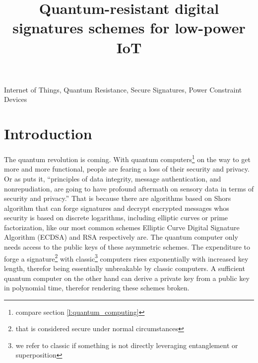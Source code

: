 \documentclass[conference]{IEEEtran}
\newcommand{\comment}[1]{}
\begin{document}
\title{Quantum-resistant digital signatures schemes for low-power IoT}

\author{
}

\maketitle

\begin{abstract}
\end{abstract}

\begin{IEEEkeywords}
Internet of Things, Quantum Resistance, Secure Signatures, Power Constraint Devices
\end{IEEEkeywords}


\section{Introduction}
\comment{ %
} %

The quantum revolution is coming. With quantum computers\footnote{compare section \ref{l:quantum_computing}} on the way to get more and more functional, people are fearing a loss of their security and privacy.
Or as \cite{QR_sigs} puts it, ``principles of data integrity, message authentication, and nonrepudiation, are going to have profound aftermath on sensory data in terms of security and privacy.''
That is because there are algorithms based on Shors algorithm that can forge signatures and decrypt encrypted messages whos security is based on discrete logarithms, including elliptic curves or prime factorization, like our most common schemes Elliptic Curve Digital Signature Algorithm (ECDSA) and RSA respectively are.
The quantum computer only needs access to the public keys of these asymmetric schemes.
The expenditure to forge a signature\footnote{that is considered secure under normal circumstances 
} with classic\footnote{we refer to classic if something is not directly leveraging entanglement or superposition} computers rises exponentially with increased key length, therefor being essentially unbreakable by classic computers.
A sufficient quantum computer on the other hand can derive a private key from a public key in polynomial time, therefor rendering these schemes broken.
\end{document}
